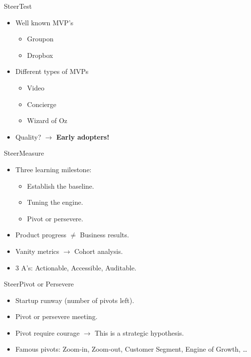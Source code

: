 \documentclass[aspectratio=169]{beamer}
\begin{document}
\begin{frame}{Steer}{Test}
  \begin{itemize}
    \item Well known MVP's
      \begin{itemize}
        \item Groupon
        \item Dropbox
      \end{itemize}
    \item Different types of MVPs
      \begin{itemize}

        \item Video
        \item Concierge
        \item Wizard of Oz
      \end{itemize}
    \item Quality? $\rightarrow$ \textbf{Early adopters!}
  \end{itemize}
\end{frame}

\begin{frame}{Steer}{Measure}
  \begin{itemize}
    \item Three learning milestone:
      \begin{itemize}
        \item Establish the baseline.
        \item Tuning the engine.
        \item Pivot or persevere.
      \end{itemize}

    \item Product progress $\neq$ Business results.
    \item Vanity metrics $\rightarrow$ Cohort analysis.
    \item 3 A's: Actionable, Accessible, Auditable.
  \end{itemize}
\end{frame}

\begin{frame}{Steer}{Pivot or Persevere}
  \begin{itemize}
    \item Startup runway (number of pivots left).
    \item Pivot or persevere meeting.
    \item Pivot require courage $\rightarrow$ This is a strategic hypothesis.
    \item Famous pivots: Zoom-in, Zoom-out, Customer Segment, Engine of Growth, \ldots
  \end{itemize}
\end{frame}
\end{document}
